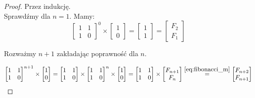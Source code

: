 \begin{proof}{Przez indukcję.}\\
Sprawdźmy dla $n = 1$. Mamy:
\begin{equation}
	\begin{bmatrix}1 & 1\\1 & 0\end{bmatrix}^0 \times \begin{bmatrix}1 \\ 0\end{bmatrix}
	= \begin{bmatrix}1 \\ 1\end{bmatrix} = \begin{bmatrix}F_2 \\ F_1\end{bmatrix}
\end{equation}

Rozważmy $n + 1$ zakładając poprawność dla $n$.

\begin{equation}
	\begin{bmatrix}1 & 1\\1 & 0\end{bmatrix}^{n + 1} \times \begin{bmatrix}1 \\ 0\end{bmatrix}
	= \begin{bmatrix}1 & 1\\1 & 0\end{bmatrix} \times \begin{bmatrix}1 & 1\\1 & 0\end{bmatrix}^{n} \times \begin{bmatrix}1 \\ 0\end{bmatrix}
	= \begin{bmatrix}1 & 1\\1 & 0\end{bmatrix} \times \begin{bmatrix}F_{n+1} \\ F_{n}\end{bmatrix}
	\stackrel{\ref{eq:fibonacci_m}}{=} \begin{bmatrix}F_{n + 2} \\ F_{n + 1}\end{bmatrix}
\end{equation}
\end{proof}


